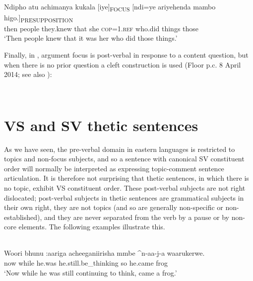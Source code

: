 \documentclass[output=paper]{langsci/langscibook}
\begin{document}
\ea\label{ex:22.nicolle}
\\
\gll Ndipho atu achimanya kukala [iye]\textsubscript{FOCUS} [ndi=ye ariyehenda mambo higo.]\textsubscript{PRESUPPOSITION}\\
then people they.knew that {\db}she {\db}\textsc{cop=1.ref} who\textsc{.}did things those \\
\glt ‘Then people knew that it was her who did those things.’
\z

Finally, in , argument focus is post-verbal in response to a content question, but when there is no prior question a cleft construction is used (Floor p.c. 8 April 2014; see also \citealt[9]{floor2005}):

\ea\label{ex:23.nicolle}
\\
\z

\z
\z

\section{VS and SV thetic sentences}\label{§5:vs.nicolle}

As we have seen, the pre-verbal domain in eastern  languages is restricted to topics and non-focus subjects, and so a sentence with canonical SV constituent order will normally be interpreted as expressing topic-comment sentence articulation. It is therefore not surprising that thetic sentences, in which there is no topic, exhibit VS constituent order. These post-verbal subjects are not right dislocated; post-verbal subjects in thetic sentences are grammatical subjects in their own right, they are not topics (and so are generally non-specific or non-established), and they are never separated from the verb by a pause or by non-core elements. The following examples illustrate this.


\ea\label{ex:24.nicolle}
\\
\gll Woori bhunu :aariga acheeganiirisha mmbe \^{}n-aa-j-a waarukerwe.\\
now while he.was he.still.be\_thinking so he.came frog\\
\glt ‘Now while he was still continuing to think, came a frog.’
\z
\end{document}
